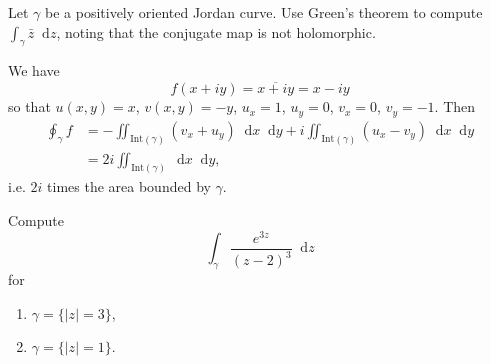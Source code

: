 \documentclass{article}
\newcommand\dif{\mathop{}\!\mathrm{d}}
\newcounter{Problem}
\newenvironment{Problem}{\begin{Exercise}[name={Problem},
                                          counter={Problem}]}
                        {\end{Exercise}}
\begin{document}
\begin{Problem}
Let $\gamma$ be a positively oriented Jordan curve. Use
Green's theorem to compute $\int_\gamma \bar{z} \dif z$,
noting that the conjugate map is not holomorphic.
\end{Problem}

\begin{Answer}
We have
$$
f(x + i y) = \overline{x + iy} = x - iy
$$
so that $u(x, y) = x$, $v(x, y) = -y$,
$u_x = 1$, $u_y = 0$, $v_x = 0$, $v_y = -1$. Then
\begin{align*}
\oint_\gamma f
&=
-
\iint_{\mathrm{Int}(\gamma)}
 (v_x + u_y) \dif x \dif y
+ i
\iint_{\mathrm{Int}(\gamma)}
  (u_x - v_y) \dif x \dif y \\
&=
2i
\iint_{\mathrm{Int}(\gamma)} \dif x \dif y,
\end{align*}
i.e. $2i$ times the area bounded by $\gamma$.
\end{Answer}

\begin{Problem}
Compute
$$
\int_\gamma \frac{e^{3z}}{(z - 2)^3} \dif z
$$
for
\begin{enumerate}[label=(\alph*)]
  \item{
    $\gamma = \{ |z| = 3 \}$,
  }
  \item{
    $\gamma = \{ |z| = 1 \}$.
  }
\end{enumerate}
\end{Problem}

\begin{Answer}

\end{Answer}
\end{document}
